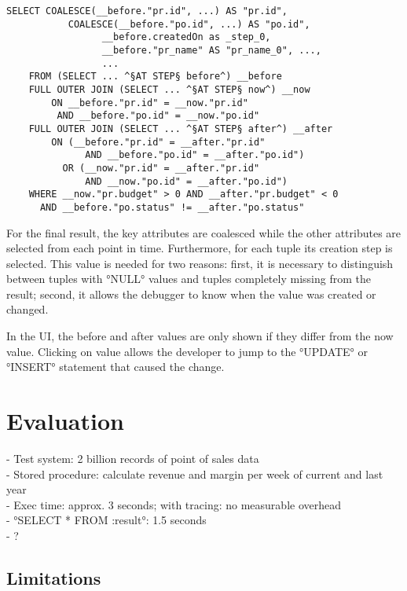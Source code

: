 \documentclass[english]{sig-alternate-05-2015}
\newcommand{\todo}[2][]{\pdfmargincomment[author={#1}]{#2}}
\begin{document}
\begin{lstlisting}[language=HanaSQL,float,caption={Parts of the time-diff query after transformation},label=lst:tdifffinal]
	SELECT COALESCE(__before."pr.id", ...) AS "pr.id",
	       COALESCE(__before."po.id", ...) AS "po.id",
				 __before.createdOn as _step_0,
				 __before."pr_name" AS "pr_name_0", ...,
				 ...
	FROM (SELECT ... ^§AT STEP§ before^) __before
	FULL OUTER JOIN (SELECT ... ^§AT STEP§ now^) __now
	    ON __before."pr.id" = __now."pr.id" 
		 AND __before."po.id" = __now."po.id"
	FULL OUTER JOIN (SELECT ... ^§AT STEP§ after^) __after
	    ON (__before."pr.id" = __after."pr.id" 
		      AND __before."po.id" = __after."po.id")
		  OR (__now."pr.id" = __after."pr.id" 
		      AND __now."po.id" = __after."po.id")
	WHERE __now."pr.budget" > 0 AND __after."pr.budget" < 0
	  AND __before."po.status" != __after."po.status"
\end{lstlisting}

For the final result, the key attributes are coalesced while the other attributes are selected from each point in time.
Furthermore, for each tuple its creation step is selected.
This value is needed for two reasons: first, it is necessary to distinguish between tuples with °NULL° values and tuples completely missing from the result; second, it allows the debugger to know when the value was created or changed.

In the UI, the before and after values are only shown if they differ from the now value.
Clicking on value allows the developer to jump to the °UPDATE° or °INSERT° statement that caused the change.


\section{Evaluation}

- Test system: 2 billion records of point of sales data \\
- Stored procedure: calculate revenue and margin per week of current and last year \\
- Exec time: approx. 3 seconds; with tracing: no measurable overhead \\
- °SELECT * FROM :result°: 1.5 seconds \\
- \todo{time-diff queries}?


\subsection{Limitations}
\end{document}
